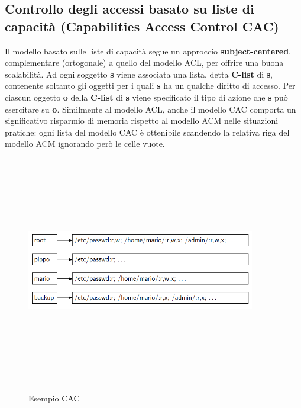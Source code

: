 \subsection{Controllo degli accessi basato su liste di capacità (Capabilities Access Control CAC)}
Il modello basato sulle liste di capacità segue un approccio \textbf{subject-centered}, complementare (ortogonale) a quello del modello ACL, per offrire una buona scalabilità. Ad ogni soggetto \textbf{s} viene associata una lista, detta \textbf{C-list} di \textbf{s}, contenente soltanto gli oggetti per i quali \textbf{s} ha un qualche diritto di accesso. Per ciascun oggetto \textbf{o} della \textbf{C-list} di \textbf{s} viene specificato il tipo di azione che \textbf{s} può esercitare su \textbf{o}. Similmente al modello ACL, anche il modello CAC comporta un significativo risparmio di memoria rispetto al modello ACM nelle situazioni pratiche: ogni lista del modello CAC è ottenibile scandendo la relativa riga del modello ACM ignorando però le celle vuote. 
\begin{figure}[htbp]
	\centering%
	\subfigure%
	{\includegraphics[height=10cm, width=10cm, keepaspectratio]{Immagini/introduzione/CAC_ex.png}}
	\caption{Esempio CAC \label{fig:CAC}} 	
\end{figure}
